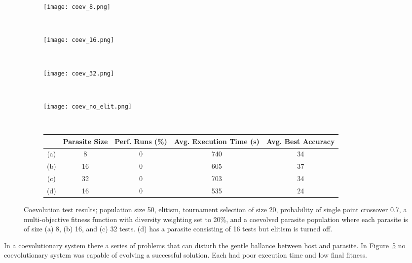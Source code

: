 \begin{figure}
	\centering
	\begin{subfigure}[ht]{0.49\textwidth}
		\texttt{[image: coev\_8.png]}
		\caption{}
		\vspace{1em}
		\label{fig:coev_8}
	\end{subfigure}
	~
	\begin{subfigure}[ht]{0.49\textwidth}
		\texttt{[image: coev\_16.png]}
		\caption{}
		\label{fig:coev_16}
		\vspace{1em}
	\end{subfigure}
	~
	\begin{subfigure}[ht]{0.49\textwidth}
		\texttt{[image: coev\_32.png]}
		\caption{}
		\label{fig:coev_32}
		\vspace{1em}
	\end{subfigure}
	~
	\begin{subfigure}[ht]{0.49\textwidth}
		\texttt{[image: coev\_no\_elit.png]}
		\caption{}
		\label{fig:coev_16_no_elit}
		\vspace{1em}
	\end{subfigure}
	~
	\begin{subfigure}[ht]{\textwidth}
		\centering
		\begin{tabular}{ccccc}
			\toprule
			& \bfseries{Parasite Size} &
			\bfseries{Perf. Runs (\%)} &
			\bfseries{Avg. Execution Time (s)} & \bfseries{Avg. Best Accuracy}\\
			\midrule
			(a) & 8 & 0 & 740 & 34 \\
			(b) & 16 & 0 & 605 & 37 \\
			(c) & 32 & 0 & 703 & 34 \\
			(d) & 16 & 0 & 535 & 24 \\
			\bottomrule
		\end{tabular}
	\end{subfigure}

	\caption[Coevolution test results]{Coevolution test results;
	population size 50, elitism, tournament selection of size 20, probability
	of single point crossover 0.7, a multi-objective fitness function with
	diversity weighting set to 20\%, and a coevolved parasite population where
	each parasite is of size
	(a) 8, (b) 16, and (c) 32 tests. (d) has a parasite consisting of 16 tests
	but elitism is turned off.}
	\label{fig:coev}
\end{figure}

In a coevolutionary system there a series of problems that can disturb the gentle
ballance between host and parasite.
In Figure~\ref{fig:coev} no coevolutionary system was capable of evolving a successful
solution. Each had poor execution time and low final fitness.

